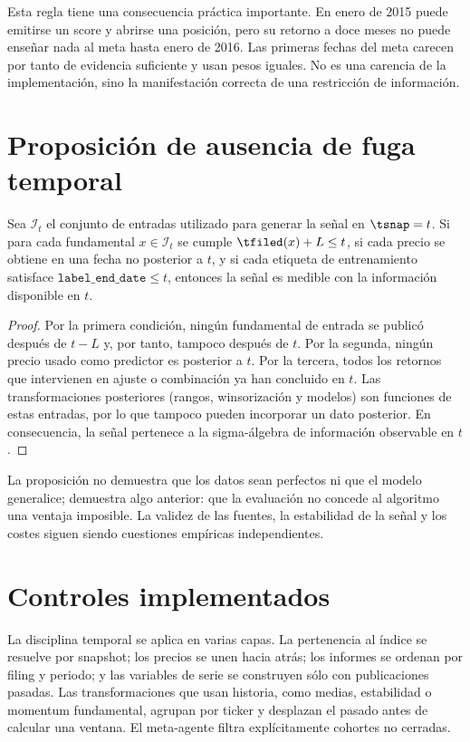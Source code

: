 Esta regla tiene una consecuencia práctica importante. En enero de 2015 puede emitirse un score y
abrirse una posición, pero su retorno a doce meses no puede enseñar nada al meta hasta enero de
2016. Las primeras fechas del meta carecen por tanto de evidencia suficiente y usan pesos iguales.
No es una carencia de la implementación, sino la manifestación correcta de una restricción de
información.

\section{Proposición de ausencia de fuga temporal}

\begin{proposicion}
\label{prop:sin-fuga}
Sea $\mathcal{I}_t$ el conjunto de entradas utilizado para generar la señal en
\(\tsnap=t\). Si para cada fundamental $x\in\mathcal{I}_t$ se cumple
$\tfiled(x)+L\leq t$, si cada precio se obtiene en una fecha no posterior a $t$, y si cada etiqueta
de entrenamiento satisface $\texttt{label\_end\_date}\leq t$, entonces la señal es medible con la
información disponible en $t$.
\end{proposicion}

\begin{proof}
Por la primera condición, ningún fundamental de entrada se publicó después
de $t-L$ y, por tanto, tampoco después de $t$. Por la segunda, ningún precio usado como predictor
es posterior a $t$. Por la tercera, todos los retornos que intervienen en ajuste o combinación ya
han concluido en $t$. Las transformaciones posteriores (rangos, winsorización y modelos) son
funciones de estas entradas, por lo que tampoco pueden incorporar un dato posterior. En
consecuencia, la señal pertenece a la sigma-álgebra de información observable en $t$.
\end{proof}

La proposición no demuestra que los datos sean perfectos ni que el modelo generalice; demuestra algo
anterior: que la evaluación no concede al algoritmo una ventaja imposible. La validez de las fuentes,
la estabilidad de la señal y los costes siguen siendo cuestiones empíricas independientes.

\section{Controles implementados}

La disciplina temporal se aplica en varias capas. La pertenencia al índice se resuelve por snapshot;
los precios se unen hacia atrás; los informes se ordenan por filing y periodo; y las variables de
serie se construyen sólo con publicaciones pasadas. Las transformaciones que usan historia, como
medias, estabilidad o momentum fundamental, agrupan por ticker y desplazan el pasado antes de
calcular una ventana. El meta-agente filtra explícitamente cohortes no cerradas.

